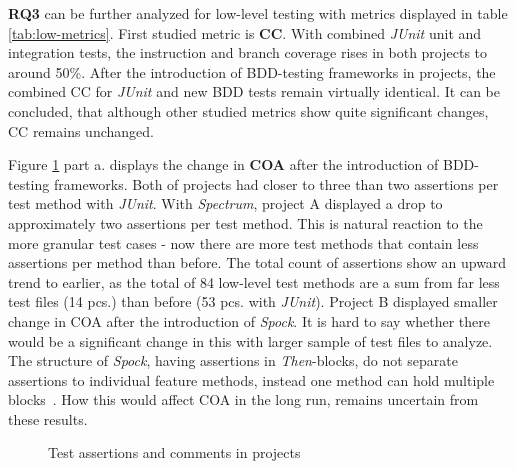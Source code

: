 \textbf{RQ3} can be further analyzed for low-level testing with metrics displayed in table \ref{tab:low-metrics}.
First studied metric is \textbf{CC}. With combined \textit{JUnit} unit and integration tests, the instruction and branch coverage rises in both projects
to around 50\%. After the introduction of BDD-testing frameworks in projects, the combined CC for \textit{JUnit} and new BDD tests remain
virtually identical. It can be concluded, that although other studied metrics show quite significant changes, CC remains
unchanged.

Figure \ref{fig:coa-coc} part a. displays the change in \textbf{COA} after the introduction of BDD-testing frameworks. Both of projects had closer to three
than two assertions per test method with \textit{JUnit}. With \textit{Spectrum}, project A displayed a drop to approximately
two assertions
per test method. This is natural reaction to the more granular test cases - now there are more test methods that contain
less assertions per method than before. The total count of assertions show an upward trend to earlier, as the total of 84 low-level
test methods are a sum from far less test files (14 pcs.) than before (53 pcs. with \textit{JUnit}).
Project B displayed smaller change in COA after the introduction of \textit{Spock}. It is hard to say whether there would be a significant
change in this with larger sample of test files to analyze. The structure of \textit{Spock}, having assertions in \textit{Then}-blocks,
do not separate assertions to individual feature methods, instead one method can hold multiple blocks~\cite{spock}. How
this would affect COA in the long run, remains uncertain from these results.

    \begin{figure}[H]%
        \centering
        \qquad
        \caption{Test assertions and comments in projects}%
        \label{fig:coa-coc}%
    \end{figure}

